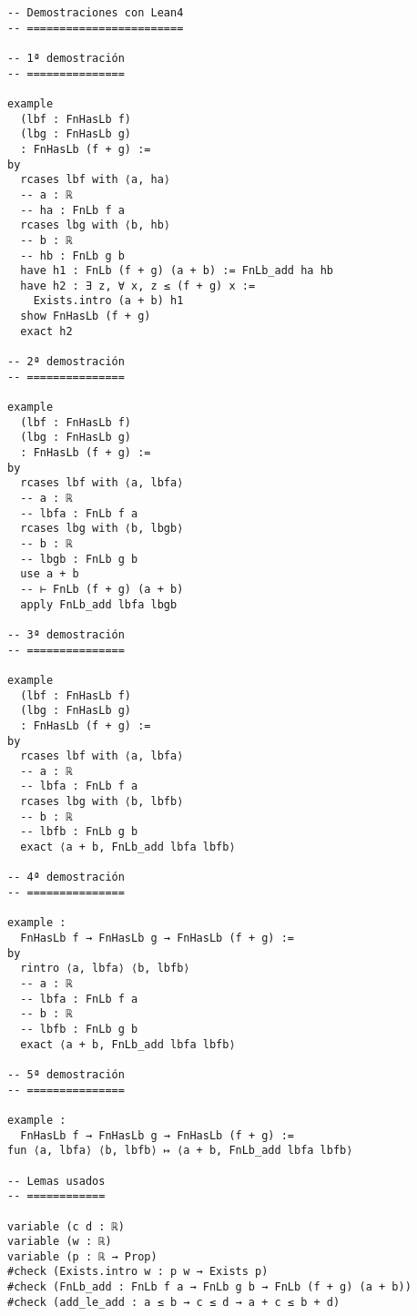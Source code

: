 \begin{verbatim}
-- Demostraciones con Lean4
-- ========================

-- 1ª demostración
-- ===============

example
  (lbf : FnHasLb f)
  (lbg : FnHasLb g)
  : FnHasLb (f + g) :=
by
  rcases lbf with ⟨a, ha⟩
  -- a : ℝ
  -- ha : FnLb f a
  rcases lbg with ⟨b, hb⟩
  -- b : ℝ
  -- hb : FnLb g b
  have h1 : FnLb (f + g) (a + b) := FnLb_add ha hb
  have h2 : ∃ z, ∀ x, z ≤ (f + g) x :=
    Exists.intro (a + b) h1
  show FnHasLb (f + g)
  exact h2

-- 2ª demostración
-- ===============

example
  (lbf : FnHasLb f)
  (lbg : FnHasLb g)
  : FnHasLb (f + g) :=
by
  rcases lbf with ⟨a, lbfa⟩
  -- a : ℝ
  -- lbfa : FnLb f a
  rcases lbg with ⟨b, lbgb⟩
  -- b : ℝ
  -- lbgb : FnLb g b
  use a + b
  -- ⊢ FnLb (f + g) (a + b)
  apply FnLb_add lbfa lbgb

-- 3ª demostración
-- ===============

example
  (lbf : FnHasLb f)
  (lbg : FnHasLb g)
  : FnHasLb (f + g) :=
by
  rcases lbf with ⟨a, lbfa⟩
  -- a : ℝ
  -- lbfa : FnLb f a
  rcases lbg with ⟨b, lbfb⟩
  -- b : ℝ
  -- lbfb : FnLb g b
  exact ⟨a + b, FnLb_add lbfa lbfb⟩

-- 4ª demostración
-- ===============

example :
  FnHasLb f → FnHasLb g → FnHasLb (f + g) :=
by
  rintro ⟨a, lbfa⟩ ⟨b, lbfb⟩
  -- a : ℝ
  -- lbfa : FnLb f a
  -- b : ℝ
  -- lbfb : FnLb g b
  exact ⟨a + b, FnLb_add lbfa lbfb⟩

-- 5ª demostración
-- ===============

example :
  FnHasLb f → FnHasLb g → FnHasLb (f + g) :=
fun ⟨a, lbfa⟩ ⟨b, lbfb⟩ ↦ ⟨a + b, FnLb_add lbfa lbfb⟩

-- Lemas usados
-- ============

variable (c d : ℝ)
variable (w : ℝ)
variable (p : ℝ → Prop)
#check (Exists.intro w : p w → Exists p)
#check (FnLb_add : FnLb f a → FnLb g b → FnLb (f + g) (a + b))
#check (add_le_add : a ≤ b → c ≤ d → a + c ≤ b + d)
\end{verbatim}

